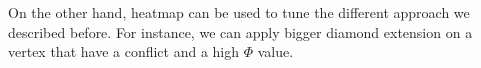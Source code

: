 On the other hand, heatmap can be used to tune the different approach we described before. For instance, we can apply bigger diamond extension on a vertex that have a conflict and a high \(\Phi\) value. 




















